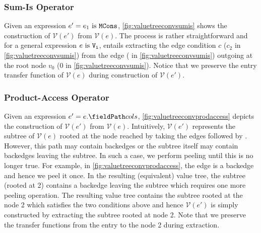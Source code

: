 \subsubsection{Sum-Is Operator}
Given an expression $e' = e_1\ \mathrm{is}\ {\tt MCons}$,
\cref{fig:valuetreeconvsumis} shows the construction of $\mathcal{V}(e')$
from $\mathcal{V}(e)$.
The process is rather straightforward and for a general expression $e\ \mathrm{is}\ {\tt V_i}$, entails extracting the
edge condition $c$ ($c_2$ in \cref{fig:valuetreeconvsumis}) from the edge
 ( in \cref{fig:valuetreeconvsumis})
outgoing at the root \sumn{} node $v_0$ (0 in \cref{fig:valuetreeconvsumis}).
Notice that we preserve the entry transfer function of $\mathcal{V}(e)$ during construction of $\mathcal{V}(e')$.

\subsubsection{Product-Access Operator}
Given an expression $e' = \prodAccess{e}{cols}$,
\cref{fig:valuetreeconvprodaccess} depicts the construction of $\mathcal{V}(e')$
from $\mathcal{V}(e)$.
Intuitively, $\mathcal{V}(e')$ represents the subtree of $\mathcal{V}(e)$ rooted at the \sumn{} node reached by taking
the edges  followed by .
However, this path may contain backedges or the subtree itself may contain backedges leaving the subtree.
In such a case, we perform peeling until this is no longer true.
For example, in \cref{fig:valuetreeconvprodaccess}, the edge  is a backedge and hence we peel it once.
In the resulting (equivalent) value tree, the subtree (rooted at 2) contains a backedge leaving the subtree which requires
one more peeling operation.
The resulting value tree contains the subtree rooted at the \sumn{} node 2 which satisfies the two conditions above and
hence $\mathcal{V}(e')$ is simply constructed by extracting the subtree rooted at \sumn{} node 2.
Note that we preserve the transfer functions from the entry to the \sumn{} node 2 during extraction.

